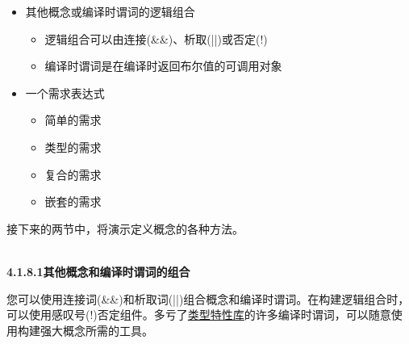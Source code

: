 \begin{itemize}
\item 
其他概念或编译时谓词的逻辑组合

\begin{itemize}
\item 
逻辑组合可以由连接(\&\&)、析取(||)或否定(!)

\item 
编译时谓词是在编译时返回布尔值的可调用对象
\end{itemize}

\item 
一个需求表达式
\begin{itemize}
\item 
简单的需求

\item 
类型的需求

\item 
复合的需求

\item 
嵌套的需求
\end{itemize}
\end{itemize}

接下来的两节中，将演示定义概念的各种方法。

\hspace*{\fill} \\ %
\noindent
\textbf{4.1.8.1\hspace{0.2cm}其他概念和编译时谓词的组合}

您可以使用连接词(\&\&)和析取词(||)组合概念和编译时谓词。在构建逻辑组合时，可以使用感叹号(!)否定组件。多亏了\href{https://en.cppreference.com/w/cpp/header/type_traits}{类型特性库}的许多编译时谓词，可以随意使用构建强大概念所需的工具。

